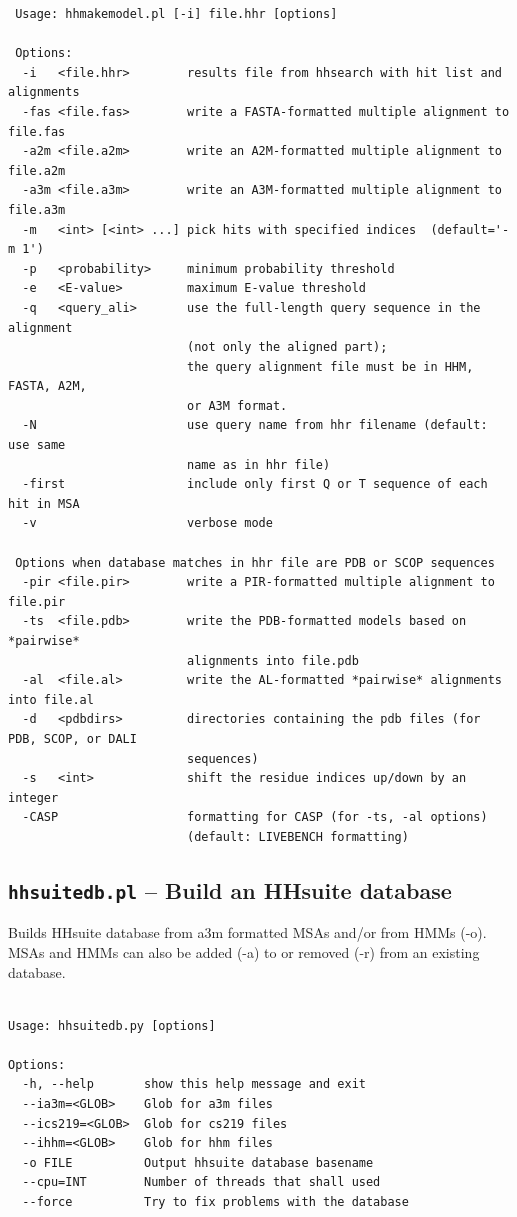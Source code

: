 \documentclass[11pt,a4paper]{article}
\begin{document}
\small 
\begin{verbatim}
 Usage: hhmakemodel.pl [-i] file.hhr [options]

 Options:
  -i   <file.hhr>        results file from hhsearch with hit list and alignments
  -fas <file.fas>        write a FASTA-formatted multiple alignment to file.fas
  -a2m <file.a2m>        write an A2M-formatted multiple alignment to file.a2m
  -a3m <file.a3m>        write an A3M-formatted multiple alignment to file.a3m
  -m   <int> [<int> ...] pick hits with specified indices  (default='-m 1')
  -p   <probability>     minimum probability threshold     
  -e   <E-value>         maximum E-value threshold      
  -q   <query_ali>       use the full-length query sequence in the alignment 
                         (not only the aligned part);
                         the query alignment file must be in HHM, FASTA, A2M,  
                         or A3M format.
  -N                     use query name from hhr filename (default: use same  
                         name as in hhr file)
  -first                 include only first Q or T sequence of each hit in MSA
  -v                     verbose mode

 Options when database matches in hhr file are PDB or SCOP sequences
  -pir <file.pir>        write a PIR-formatted multiple alignment to file.pir 
  -ts  <file.pdb>        write the PDB-formatted models based on *pairwise*  
                         alignments into file.pdb
  -al  <file.al>         write the AL-formatted *pairwise* alignments into file.al
  -d   <pdbdirs>         directories containing the pdb files (for PDB, SCOP, or DALI  
                         sequences)
  -s   <int>             shift the residue indices up/down by an integer           
  -CASP                  formatting for CASP (for -ts, -al options) 
                         (default: LIVEBENCH formatting)
\end{verbatim} 
\normalsize


\subsection{{\tt hhsuitedb.pl} -- Build an HHsuite database }

Builds HHsuite database from a3m formatted MSAs and/or from HMMs (-o).
MSAs and HMMs can also be added (-a) to or removed (-r) from an existing database. 

\small 
\begin{verbatim}

Usage: hhsuitedb.py [options]

Options:
  -h, --help       show this help message and exit
  --ia3m=<GLOB>    Glob for a3m files
  --ics219=<GLOB>  Glob for cs219 files
  --ihhm=<GLOB>    Glob for hhm files
  -o FILE          Output hhsuite database basename
  --cpu=INT        Number of threads that shall used
  --force          Try to fix problems with the database

\end{verbatim} 
\normalsize
\end{document}

